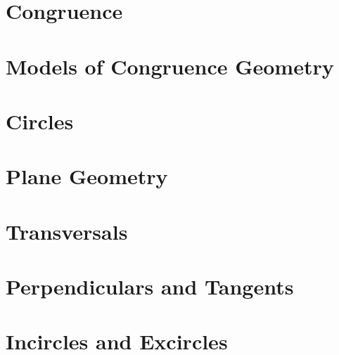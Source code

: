 \documentclass{memoir}
\begin{document}
  \section{Congruence}
    
    \newpage

  \section{Models of Congruence Geometry}
    
    \newpage

  \section{Circles}
    
    \newpage

  \section{Plane Geometry}
    
    \newpage

  \section{Transversals}
    
    \newpage

  \section{Perpendiculars and Tangents}
    
    \newpage

  \section{Incircles and Excircles}
    

\backmatter
  \printindex
\end{document}
